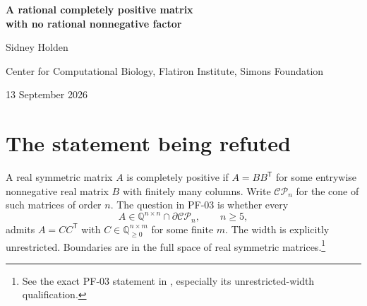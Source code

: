 \documentclass[11pt]{article}
\theoremstyle{definition}
\newcommand{\R}{\mathbb R}
\newcommand{\Q}{\mathbb Q}
\newcommand{\CP}{\mathcal{CP}}
\newcommand{\trans}{^{\mathsf T}}
\numberwithin{equation}{section}
\begin{document}
\begin{center}
{\LARGE\bfseries A rational completely positive matrix\\[0.2em]
with no rational nonnegative factor}\par\medskip
{\large Sidney Holden}\par\smallskip
Center for Computational Biology, Flatiron Institute, Simons Foundation\par
13 September 2026
\end{center}

\begin{abstract}
An explicit integer matrix of order $444$ and rank seven is constructed that
is completely positive over the reals but has no nonnegative rational Gram
factor of any finite width. All its entries are strictly positive, and its real
cp-rank is seven. The construction gives a negative answer to the universal
boundary-factorization question PF-03. The obstruction is a rational
polyhedral cone in $\R^7$ on which a trace-zero quadratic form is nonnegative
and has exactly seven irrational zero rays forming an orthonormal basis.
The arithmetic seed lies in $\Q(\sqrt[3]{2})$. Rational interval calculations
certify its signs, and exhaustive integer computation certifies all $444$
facets of the cone. The complete matrix, a compact integer representation,
and a standard-library Python verifier accompany the proof. This is a
computer-assisted proof that passed an independent informal Codex AI-agent
audit on 13 September 2026; the accompanying independent-review report
records the checks. It has not received external human peer review or
formal proof-assistant verification.
\end{abstract}

\section{The statement being refuted}
A real symmetric matrix $A$ is completely positive if $A=BB\trans$ for some
entrywise nonnegative real matrix $B$ with finitely many columns. Write
$\CP_n$ for the cone of such matrices of order $n$. The question in PF-03 is
whether every
\begin{equation}\label{eq:question}
 A\in\Q^{n\times n}\cap\partial\CP_n,\qquad n\geq5,
\end{equation}
admits $A=CC\trans$ with $C\in\Q_{\geq0}^{n\times m}$ for some finite $m$.
The width is explicitly unrestricted. Boundaries are in the full space of
real symmetric matrices.\footnote{See the exact PF-03 statement in
\cite{repo}, especially its unrestricted-width qualification.}
\end{document}
